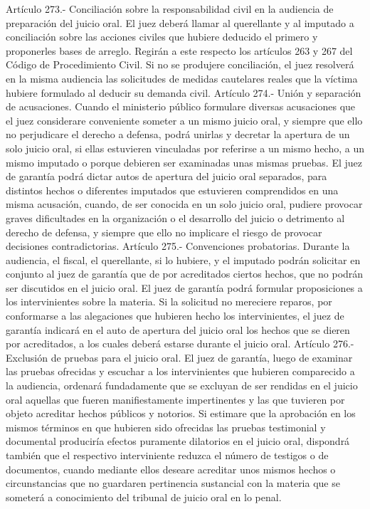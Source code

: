     Artículo 273.- Conciliación sobre la responsabilidad civil en la audiencia de preparación del juicio oral. El juez deberá llamar al querellante y al imputado a conciliación sobre las acciones civiles que hubiere deducido el primero y proponerles bases de arreglo. Regirán a este respecto los artículos 263 y 267 del Código de Procedimiento Civil.
    Si no se produjere conciliación, el juez resolverá en la misma audiencia las solicitudes de medidas cautelares reales que la víctima hubiere formulado al deducir su demanda civil.
    Artículo 274.- Unión y separación de acusaciones. Cuando el ministerio público formulare diversas acusaciones que el juez considerare conveniente someter a un mismo juicio oral, y siempre que ello no perjudicare el derecho a defensa, podrá unirlas y decretar la apertura de un solo juicio oral, si ellas estuvieren vinculadas por referirse a un mismo hecho, a un mismo imputado o porque debieren ser examinadas unas mismas pruebas.
    El juez de garantía podrá dictar autos de apertura del juicio oral separados, para distintos hechos o diferentes imputados que estuvieren comprendidos en una misma acusación, cuando, de ser conocida en un solo juicio oral, pudiere provocar graves dificultades en la organización o el desarrollo del juicio o detrimento al derecho de defensa, y siempre que ello no implicare el riesgo de provocar decisiones contradictorias.
    Artículo 275.- Convenciones probatorias. Durante la audiencia, el fiscal, el querellante, si lo hubiere, y el imputado podrán solicitar en conjunto al juez de garantía que de por acreditados ciertos hechos, que no podrán ser discutidos en el juicio oral. El juez de garantía podrá formular proposiciones a los intervinientes sobre la materia.
    Si la solicitud no mereciere reparos, por conformarse a las alegaciones que hubieren hecho los intervinientes, el juez de garantía indicará en el auto de apertura del juicio oral los hechos que se dieren por acreditados, a los cuales deberá estarse durante el juicio oral.
    Artículo 276.- Exclusión de pruebas para el juicio oral. El juez de garantía, luego de examinar las pruebas ofrecidas y escuchar a los intervinientes que hubieren comparecido a la audiencia, ordenará fundadamente que se excluyan de ser rendidas en el juicio oral aquellas que fueren manifiestamente impertinentes y las que tuvieren por objeto acreditar hechos públicos y notorios.
    Si estimare que la aprobación en los mismos términos en que hubieren sido ofrecidas las pruebas testimonial y documental produciría efectos puramente dilatorios en el juicio oral, dispondrá también que el respectivo interviniente reduzca el número de testigos o de documentos, cuando mediante ellos deseare acreditar unos mismos hechos o circunstancias que no guardaren pertinencia sustancial con la materia que se someterá a conocimiento del tribunal de juicio oral en lo penal.
